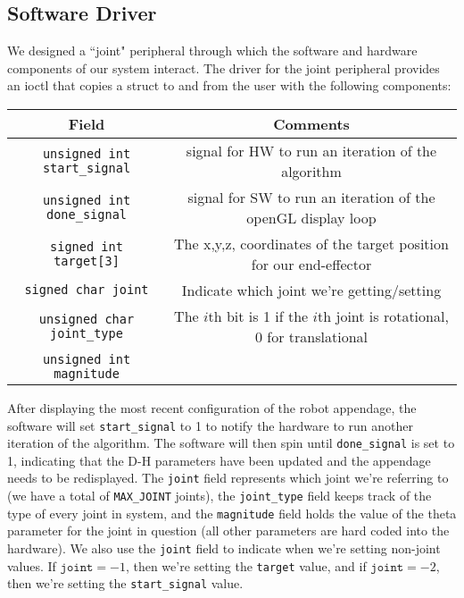 \subsection{Software Driver}

We designed a ``joint" peripheral through which the software and 
hardware components of our system interact. 
The driver for the joint peripheral provides an ioctl that copies a struct to and from the 
user with the following components:

\begin{center}
	\begin{tabular}{|c|c|}
		\hline
		Field & Comments \\
		\hline
		\texttt{unsigned int start\_signal} & signal for HW to run an iteration of the algorithm\\
		\hline
		\texttt{unsigned int done\_signal} & signal for SW to run an iteration of the openGL display loop\\
		\hline
		\texttt{signed int target[3]} &  The x,y,z, coordinates of the target position 
																						for our end-effector \\
		\hline
		\texttt{signed char joint} &  Indicate which joint we're getting/setting\\
		\hline
		\texttt{unsigned char joint\_type} & The $i$th bit is 1 if the $i$th joint is rotational, 
																					0 for translational \\
		\hline
		\texttt{unsigned int magnitude} & ~\\
		\hline
	\end{tabular}
\end{center}
After displaying the most recent configuration of the robot appendage, the software will set
\texttt{start\_signal} to 1 to notify the hardware to run another iteration of the algorithm. The
software will then spin until \texttt{done\_signal} is set to 1, indicating that the D-H parameters have been
updated and the appendage needs to be redisplayed.
The \texttt{joint} field represents which joint we're referring to 
(we have a total of \texttt{MAX\_JOINT} joints), the \texttt{joint\_type}
field keeps track of the type of every joint in system,  
and the \texttt{magnitude} field holds the value of the theta parameter for the joint in question (all other parameters are hard coded
		into the hardware).
We also use the \texttt{joint} field to indicate when we're setting non-joint values. If
$\texttt{joint} = -1$, then we're setting the \texttt{target} value, and if $\texttt{joint} = -2$,
then we're setting the \texttt{start\_signal} value.

